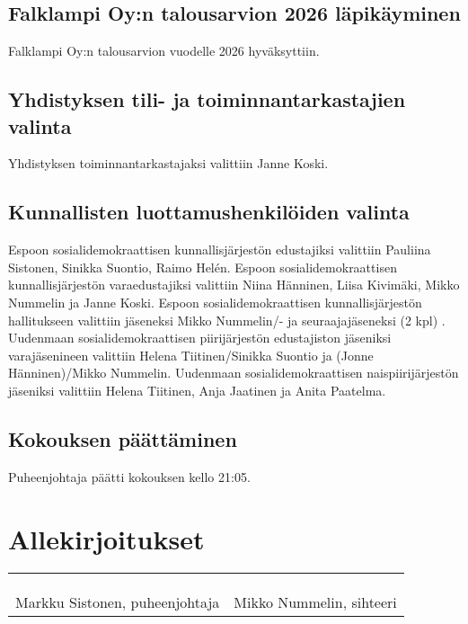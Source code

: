 \documentclass[a4paper,12pt]{article}
\begin{document}
\subsection{Falklampi Oy:n talousarvion 2026 läpikäyminen}
Falklampi Oy:n talousarvion vuodelle 2026 hyväksyttiin.
\subsection{Yhdistyksen tili- ja toiminnantarkastajien valinta}
Yhdistyksen toiminnantarkastajaksi valittiin Janne Koski.
\subsection{Kunnallisten luottamushenkilöiden valinta}
Espoon sosialidemokraattisen kunnallisjärjestön edustajiksi valittiin Pauliina Sistonen, Sinikka Suontio, Raimo Helén. Espoon sosialidemokraattisen kunnallisjärjestön varaedustajiksi valittiin Niina Hänninen, Liisa Kivimäki, Mikko Nummelin ja Janne Koski. Espoon sosialidemokraattisen kunnallisjärjestön hallitukseen valittiin jäseneksi Mikko Nummelin/- ja seuraajajäseneksi (2 kpl) . Uudenmaan sosialidemokraattisen piirijärjestön edustajiston jäseniksi varajäsenineen valittiin Helena Tiitinen/Sinikka Suontio ja (Jonne Hänninen)/Mikko Nummelin. Uudenmaan sosialidemokraattisen naispiirijärjestön jäseniksi valittiin Helena Tiitinen, Anja Jaatinen ja Anita Paatelma.
\subsection{Kokouksen päättäminen}
Puheenjohtaja päätti kokouksen kello 21:05.
\section*{Allekirjoitukset}
\begin{flushleft}
\begin{tabular}{ll}
& \\
& \\
& \\
Markku Sistonen, puheenjohtaja &
Mikko Nummelin, sihteeri %
\end{tabular}
\end{flushleft}
\end{document}
